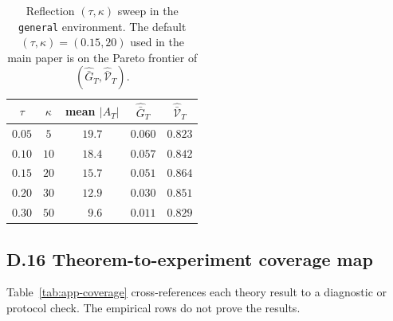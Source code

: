 \documentclass{article} %
\begin{document}
\begin{table}[h]
\centering
\small
\begin{tabular}{ccccc}
\toprule
$\tau$ & $\kappa$ & mean $|A_T|$ & $\widehat{\bar G}_T$ & $\widehat{\bar{\mathcal V}}_T$ \\
\midrule
$0.05$ & $5$  & $19.7$ & $0.060$ & $0.823$ \\
$0.10$ & $10$ & $18.4$ & $0.057$ & $0.842$ \\
$0.15$ & $20$ & $15.7$ & $0.051$ & $0.864$ \\
$0.20$ & $30$ & $12.9$ & $0.030$ & $0.851$ \\
$0.30$ & $50$ & $\phantom{0}9.6$ & $0.011$ & $0.829$ \\
\bottomrule
\end{tabular}
\caption{Reflection $(\tau,\kappa)$ sweep in the \texttt{general} environment. The default $(\tau,\kappa)=(0.15,20)$ used in the main paper is on the Pareto frontier of $(\widehat{\bar G}_T, \widehat{\bar{\mathcal V}}_T)$.}
\label{tab:app-reflect-sweep}
\end{table}

\subsection{D.16 Theorem-to-experiment coverage map}

\label{app:tab-coverage}

Table~\ref{tab:app-coverage} cross-references each theory result to a diagnostic
or protocol check. The empirical rows do not prove the results.
\end{document}

